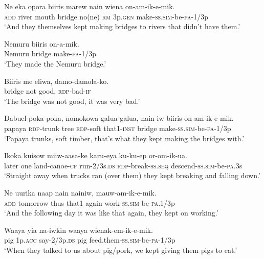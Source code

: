 {\ea\label{ex:a:x48}
\gll  Ne  eka  opora  biiris  marew  nain  wiena  on-am-ik-e-mik. \\
\textsc{add}  river  mouth  bridge  no(ne)  \textsc{rm}  3p.\textsc{gen} make-\textsc{ss}.\textsc{sim}-be-\textsc{pa}-1/3p \\ 
\glt ‘And they themselves kept making bridges to rivers that didn’t have them.’ \\
\z


\ea\label{ex:a:x49}
\gll  Nemuru  biiris  on-a-mik. \\
Nemuru  bridge  make-\textsc{pa}-1/3p \\
\glt ‘They made the Nemuru bridge.’ \\
\z


\ea\label{ex:a:x50}
\gll  Biiris  me  eliwa,  damo-damola-ko. \\
bridge  not  good,  \textsc{rdp}-bad-\textsc{if} \\
\glt ‘The bridge was not good, it was very bad.’ \\
\z


\ea\label{ex:a:x51}
\gll  Dabuel  poka-poka,  nomokowa  galua-galua,  nain-iw  biiris  on-am-ik-e-mik. \\
papaya  \textsc{rdp}-trunk  tree  \textsc{rdp}-soft that1-\textsc{inst}  bridge  make-\textsc{ss}.\textsc{sim}-be-\textsc{pa}-1/3p\\ 
\glt ‘Papaya trunks, soft timber, that’s what they kept making the bridges with.’ \\
\z


\ea\label{ex:a:x52}
\gll  Ikoka  kuisow  miiw-aasa-ke  karu-eya  ku-ku-ep   or-om-ik-ua. \\
later  one  land-canoe-\textsc{cf}  run-2/3s.\textsc{ds}  \textsc{rdp}-break-\textsc{ss.seq} descend-\textsc{ss}.\textsc{sim}-be-\textsc{pa}.3s \\ 
\glt ‘Straight away when trucks ran (over them) they kept breaking and falling down.’ \\
\z


\ea\label{ex:a:x53}
\gll  Ne  uurika  naap  nain  nainiw,  mauw-am-ik-e-mik. \\
\textsc{add}  tomorrow  thus  that1  again  work-\textsc{ss}.\textsc{sim}-be-\textsc{pa}.1/3p \\
\glt ‘And the following day it was like that again, they kept on working.’ \\
\z


\ea\label{ex:a:x54}
\gll  Waaya  yia  na-iwkin  waaya  wienak-em-ik-e-mik. \\
pig  1p.\textsc{acc}  say-2/3p.\textsc{ds}  pig  feed.them{}-\textsc{ss}.\textsc{sim}-be-\textsc{pa}-1/3p \\
\glt ‘When they talked to us about pig/pork, we kept giving them pigs to eat.’ \\
\z


}
